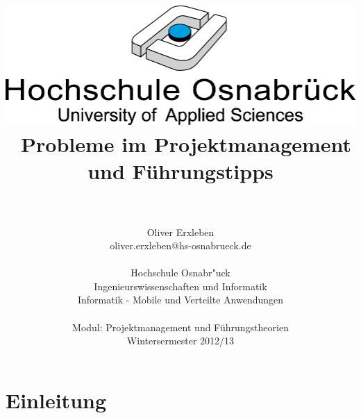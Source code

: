 \documentclass[11pt]{scrartcl}
\begin{document}
\author{\\ \\ Oliver Erxleben \\ oliver.erxleben@hs-osnabrueck.de 
\\ \\ Hochschule Osnabr"uck \\
Ingenieurswissenschaften und Informatik \\ Informatik - Mobile und Verteilte Anwendungen
\\ \\ Modul: Projektmanagement und Führungstheorien \\ Wintersermester 2012/13 }

\title{\includegraphics[scale=0.75,keepaspectratio]{img/hs_os.png}\linebreak \linebreak
\\ \ Probleme im Projektmanagement und Führungstipps}

\maketitle
\thispagestyle{empty}

\pagebreak

\tableofcontents

\thispagestyle{empty}
\pagebreak

\pagestyle{plain}
\setcounter{page}{1} 
\section{Einleitung}

\cite{tipps_zum_pm}

\cite{studie_verhalten_projektmitarbeiter}
\end{document}
